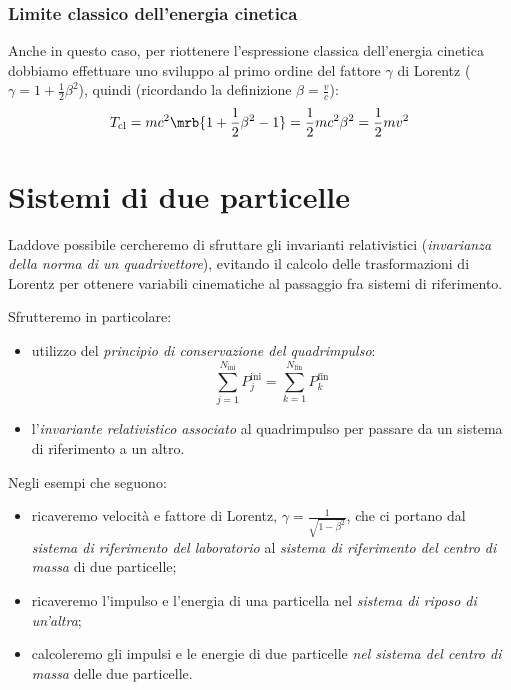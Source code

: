 \subsubsection{Limite classico dell'energia cinetica}
Anche in questo caso, per riottenere l'espressione classica dell'energia
cinetica dobbiamo effettuare uno sviluppo al primo ordine del fattore $\gamma$
di Lorentz ($\gamma = 1 + \frac{1}{2}\beta^2$), quindi (ricordando la
definizione $\beta = \frac{v}{c}$):
\begin{equation}
	T_{\text{cl}} = mc^2\mrb{1+ \frac{1}{2}\beta^2 - 1} = \frac{1}{2}mc^2\beta^2 =
	\frac{1}{2}mv^2
\end{equation}

\section{Sistemi di due particelle}
Laddove possibile cercheremo di sfruttare gli invarianti relativistici
(\textit{invarianza della norma di un quadrivettore}), evitando il calcolo
delle trasformazioni di Lorentz per ottenere variabili cinematiche al passaggio
fra sistemi di riferimento.

Sfrutteremo in particolare:
\begin{itemize}
	\item utilizzo del \textit{principio di conservazione del quadrimpulso}:
	      \begin{equation}
		      \sum_{j=1}^{N_{\text{ini}}} P_j^{\text{ini}}
		      = \sum_{k=1}^{N_{\text{fin}}} P_k^{\text{fin}}
	      \end{equation}
	\item l'\textit{invariante relativistico associato} al quadrimpulso per
	      passare da un sistema di riferimento a un altro.
\end{itemize}
Negli esempi che seguono:
\begin{itemize}
	\item ricaveremo velocità e fattore di Lorentz,
	      $\gamma = \frac{1}{\sqrt{1 - \beta^2}}$, che ci portano dal \textit{sistema
		      di riferimento del laboratorio} al \textit{sistema di riferimento del
		      centro di massa} di due particelle;
	\item ricaveremo l'impulso e l'energia di una particella nel \textit{sistema
		      di riposo di un'altra};
	\item calcoleremo gli impulsi e le energie di due particelle \textit{nel
		      sistema del centro di massa} delle due particelle.
\end{itemize}

